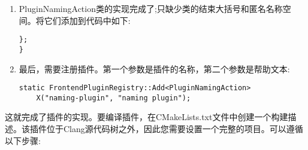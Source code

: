 \begin{enumerate}
\item PluginNamingAction类的实现完成了;只缺少类的结束大括号和匿名名称空间。将它们添加到代码中如下:
\begin{lstlisting}[caption={}]
};
}
\end{lstlisting}

\item 最后，需要注册插件。第一个参数是插件的名称，第二个参数是帮助文本:
\begin{lstlisting}[caption={}]
static FrontendPluginRegistry::Add<PluginNamingAction>
	X("naming-plugin", "naming plugin");
\end{lstlisting}

\end{enumerate}

这就完成了插件的实现。要编译插件，在CMakeLists.txt文件中创建一个构建描述。该插件位于Clang源代码树之外，因此您需要设置一个完整的项目。可以遵循以下步骤:\par

